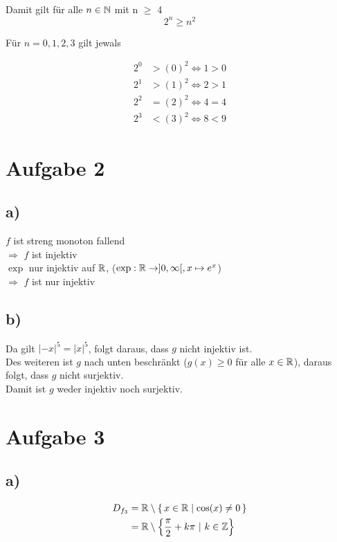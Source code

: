 \documentclass[a4paper, 11pt]{article}
\begin{document}
Damit gilt für alle \(n \in \mathbb{N}\) mit n \(\ge\) 4
$$ 2^n \geq n^2 $$

Für \(n = 0, 1, 2, 3\) gilt jewals

\begin{align*}
    2^0 &> (0)^2 \Leftrightarrow 1 > 0 \\
    2^1 &> (1)^2 \Leftrightarrow 2 > 1 \\
    2^2 &= (2)^2 \Leftrightarrow 4 = 4 \\
    2^3 &< (3)^2 \Leftrightarrow 8 < 9
\end{align*}

\section{Aufgabe 2}
\label{sec:org3f2716f}
\subsection{a)}
\label{sec:orgea7be82}
\(f\) ist streng monoton fallend \\
\(\Rightarrow\) \(f\) ist injektiv \\

\(\exp\) nur injektiv auf \(\mathbb{R}\), (\(\exp : \mathbb{R} \rightarrow ]0, \infty[, x \mapsto e^x\))\\
\(\Rightarrow\) \(f\) ist nur injektiv

\subsection{b)}
\label{sec:orga03fc0c}
Da gilt \(|-x|^5 = |x|^5\), folgt daraus, dass \(g\) nicht injektiv ist. \\
Des weiteren ist \(g\) nach unten beschränkt (\(g(x) \geq 0\) für alle \(x \in \mathbb{R}\)), daraus folgt,
dass \(g\) nicht surjektiv. \\
Damit ist \(g\) weder injektiv noch surjektiv.

\section{Aufgabe 3}
\label{sec:orgf42f9b5}
\subsection{a)}
\label{sec:org88d5b04}
\begin{align*}
    D_{f_3} &= \mathbb{R} \setminus \set{x \in \mathbb{R}| \cos(x) \neq 0} \\
    &= \mathbb{R} \setminus \left\{ \frac{\pi}{2} + k\pi \text{ | } k \in \mathbb{Z} \right\}
\end{align*}
\end{document}
